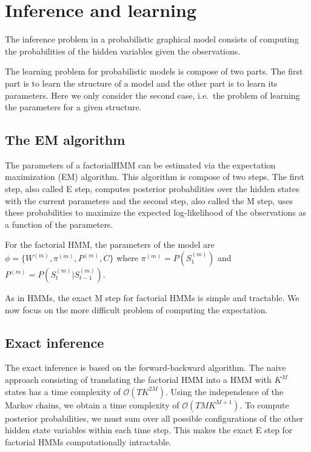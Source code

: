 \documentclass{article}
\begin{document}
\section{Inference and learning}

The inference problem in a probabilistic graphical model consists of computing the probabilities of the hidden variables given the observations.

The learning problem for probabilistic models is compose of two parts. The first part is to learn the structure of a model and the other part is to learn its parameters. Here we only consider the second case, i.e.\ the problem of learning the parameters for a given structure. 

\subsection{The EM algorithm}

The parameters of a factorialHMM can be estimated via the expectation maximization (EM) algorithm. This algorithm is compose of two steps. The first step, also called E step, computes posterior probabilities over the hidden states with the current parameters and the second step, also called the M step, uses these probabilities to maximize the expected log-likelihood of the observations as a function of the parameters.

For the factorial HMM, the parameters of the model are $\phi = \{ W^{(m)}, \pi^{(m)}, P^{(m)}, C \}$ where $\pi^{(m)} = P(S_1^{(m)})$ and $P^{(m)} = P(S_t^{(m)} | S_{t-1}^{(m)})$. 

As in HMMs, the exact M step for factorial HMMs is simple and tractable. We now focus on the more difficult problem of computing the expectation.

\subsection{Exact inference}

The exact inference is based on the forward-backward algorithm. The naive approach consisting of translating the factorial HMM into a HMM with $K^M$ states has a time complexity of $\mathcal{O}(T K^{2M})$. Using the independence of the Markov chains, we obtain a time complexity of $\mathcal{O}(T M K^{M+1})$. To compute posterior probabilities, we must sum over all possible configurations of the other hidden state variables within each time step. This makes the exact E step for factorial HMMs computationally intractable.
\end{document}

